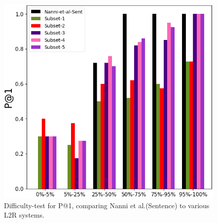 \begin{figure}
    \centering
    \includegraphics [scale=0.5]{plot-cropped.png}
    \caption{Difficulty-test for P@1, comparing Nanni et al.(Sentence) to various L2R systems.}
    \label{fig:difficulty-plot}
\end{figure}


